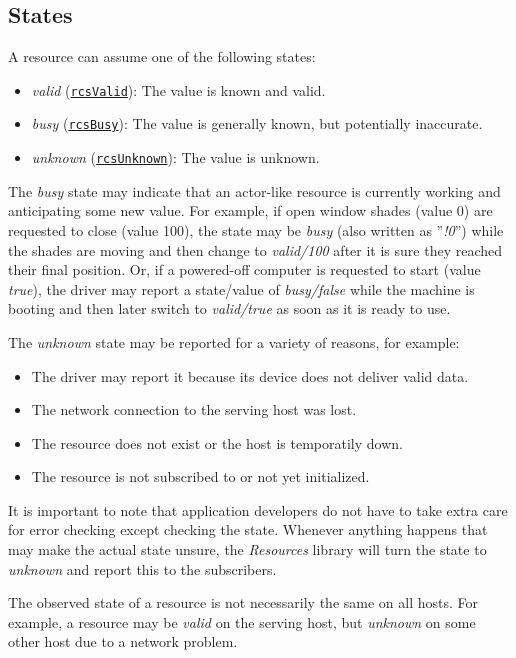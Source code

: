 \documentclass[12pt,english,parskip=half,headheight=19pt]{scrreprt}
\newcommand{\refapic}[1]{\href{home2l-api_c/index.html}{\mbox{\texttt{#1}}}}            %
\begin{document}
\subsection{States}
\label{sec:resources-resources-states}

A resource can assume one of the following states:

\begin{itemize}
  \item \textit{valid} (\refapic{rcsValid}): The value is known and valid.
  \item \textit{busy} (\refapic{rcsBusy}): The value is generally known, but potentially inaccurate.
  \item \textit{unknown} (\refapic{rcsUnknown}): The value is unknown.
\end{itemize}

The \textit{busy} state may indicate that an actor-like resource is
currently working and anticipating some new value. For example, if
open window shades (value 0) are requested to close (value 100), the state may be
\textit{busy} (also written as ''\textit{!0}'') while the shades are
moving and then change to \textit{valid/100} after it is sure they reached
their final position. Or, if a powered-off computer is requested to
start (value \textit{true}), the driver may report a state/value of \textit{busy/false}
while the machine is booting and then later switch to \textit{valid/true} as soon as
it is ready to use.

The \textit{unknown} state may be reported for a variety of reasons, for example:
\begin{itemize}
  \item The driver may report it because its device does not deliver valid data.
  \item The network connection to the serving host was lost.
  \item The resource does not exist or the host is temporatily down.
  \item The resource is not subscribed to or not yet initialized.
\end{itemize}

It is important to note that application developers do not have to take
extra care for error checking except checking the state.
Whenever anything happens that may make the actual state unsure, the \textit{Resources} library
will turn the state to \textit{unknown} and report this to the subscribers.

The observed state of a resource is not necessarily the same on all hosts. For example, a resource
may be \textit{valid} on the serving host, but \textit{unknown} on some other host due to
a network problem.
\end{document}
